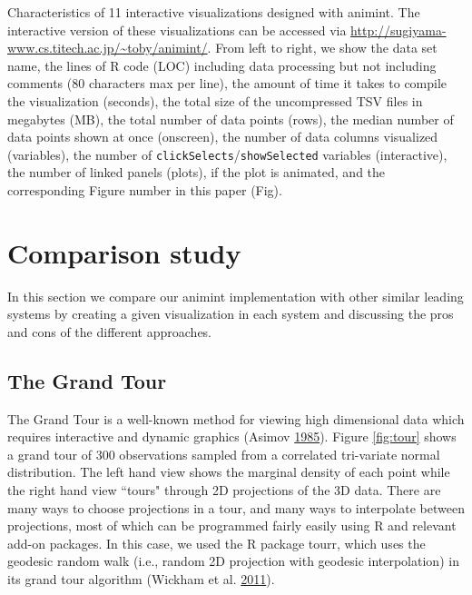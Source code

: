 \documentclass[12pt,]{isuthesis}
\begin{document}
\begin{table}[htp] %
  \centering
  \hspace*{-2cm}
  
  \vskip 0.2cm
  \caption{Characteristics of 11 interactive visualizations designed with
    animint. The interactive version of these visualizations can be accessed 
    via \url{http://sugiyama-www.cs.titech.ac.jp/\~toby/animint/}.
    From left to right, we show the data set name, the
    lines of R code (LOC) including data processing but not including comments
    (80 characters max per line),
    the amount of time it takes to compile the visualization (seconds),
    the total size of the uncompressed TSV files in megabytes (MB),
    the total number of data points (rows),
    the median number of data points shown at once (onscreen),
    the number of data columns visualized (variables),
    the number of \texttt{clickSelects}/\texttt{showSelected} 
    variables (interactive),
    the number of linked panels (plots),
    if the plot is animated,
    and the corresponding Figure number in this paper (Fig).
  }
\label{tab:examples}
\end{table}

\section{Comparison study}
\label{sec:compare}

In this section we compare our animint implementation with other similar
leading systems by creating a given visualization in each system and
discussing the pros and cons of the different approaches.

\subsection{The Grand Tour}
\label{sec:tour}

The Grand Tour is a well-known method for viewing high dimensional data
which requires interactive and dynamic graphics (Asimov
\protect\hyperlink{ref-grand-tour}{1985}). Figure \ref{fig:tour} shows a
grand tour of 300 observations sampled from a correlated tri-variate
normal distribution. The left hand view shows the marginal density of
each point while the right hand view ``tours" through 2D projections of
the 3D data. There are many ways to choose projections in a tour, and
many ways to interpolate between projections, most of which can be
programmed fairly easily using R and relevant add-on packages. In this
case, we used the R package tourr, which uses the geodesic random walk
(i.e., random 2D projection with geodesic interpolation) in its grand
tour algorithm (Wickham et al. \protect\hyperlink{ref-tourr}{2011}).
\end{document}

